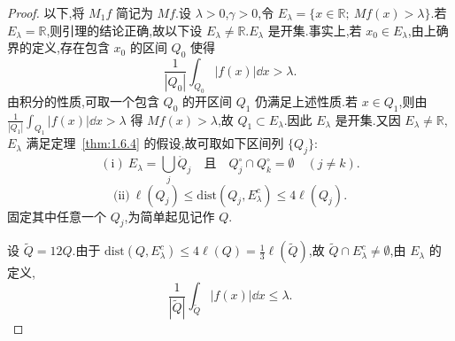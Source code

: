 \begin{proof}
以下,将 $M_{1}f$ 简记为 $Mf$.设 $\lambda > 0$,$\gamma > 0$,令 $E_{\lambda} = \{x \in \mathbb{R};\ Mf(x) > \lambda\}$.若 $E_{\lambda} = \mathbb{R}$,则引理的结论正确,故以下设 $E_{\lambda} \neq \mathbb{R}$.$E_{\lambda}$ 是开集.事实上,若 $x_{0} \in E_{\lambda}$,由上确界的定义,存在包含 $x_{0}$ 的区间 $Q_{0}$ 使得
\begin{equation*}
\frac{1}{|Q_{0}|}\int_{Q_{0}}|f(x)|\dd x > \lambda.
\end{equation*}
由积分的性质,可取一个包含 $Q_{0}$ 的开区间 $Q_{1}$ 仍满足上述性质.若 $x \in Q_{1}$,则由 $\frac{1}{|Q_{1}|}\int_{Q_{1}}|f(x)|\dd x > \lambda$ 得 $Mf(x) > \lambda$,故 $Q_{1} \subset E_{\lambda}$.因此 $E_{\lambda}$ 是开集.又因 $E_{\lambda} \neq \mathbb{R}$,$E_{\lambda}$ 满足定理~\ref{thm:1.6.4} 的假设,故可取如下区间列 $\{Q_{j}\}$:
\begin{equation*}
(\mathrm{i})\ E_{\lambda} = \bigcup_{j}\mathring{Q}_{j} \quad \text{且} \quad Q_{j}^{\circ} \cap Q_{k}^{\circ} = \emptyset \quad (j \neq k).
\end{equation*}
\begin{equation*}
\text{(ii)}\ \ell(Q_{j}) \leq \mathrm{dist}(Q_{j}, E_{\lambda}^{c}) \leq 4\ell(Q_{j}).
\end{equation*}
固定其中任意一个 $Q_{j}$,为简单起见记作 $Q$.

设 $\tilde{Q} = 12Q$.由于 $\mathrm{dist}(Q, E_{\lambda}^{c}) \leq 4\ell(Q) = \frac{1}{3}\ell(\tilde{Q})$,故 $\tilde{Q} \cap E_{\lambda}^{c} \neq \emptyset$,由 $E_{\lambda}$ 的定义,
\begin{equation*}
\frac{1}{|\tilde{Q}|}\int_{\tilde{Q}}|f(x)|\dd x \leq \lambda.
\end{equation*}


\end{proof}
